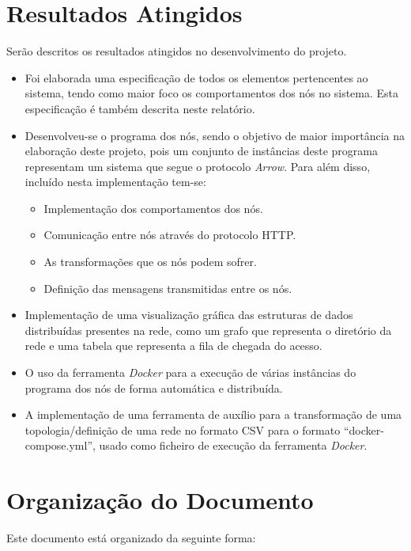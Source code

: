 \section{Resultados Atingidos}
\label{introducao:sec:resultados}
Serão descritos os resultados atingidos no desenvolvimento do projeto.

\begin{itemize}
    \item Foi elaborada uma especificação de todos os elementos pertencentes ao sistema, tendo como maior foco os comportamentos dos nós no sistema. Esta especificação é também descrita neste relatório. 
    \item Desenvolveu-se o programa dos nós, sendo o objetivo de maior importância na elaboração deste projeto, pois um conjunto de instâncias deste programa representam um sistema que segue o protocolo \emph{Arrow}. Para além disso, incluído nesta implementação tem-se:

    \begin{itemize}
	\item Implementação dos comportamentos dos nós.
	\item Comunicação entre nós através do protocolo \acs{HTTP}.
	\item As transformações que os nós podem sofrer.
	\item Definição das mensagens transmitidas entre os nós.
    \end{itemize}

    \item Implementação de uma visualização gráfica das estruturas de dados distribuídas presentes na rede, como um grafo que representa o diretório da rede e uma tabela que representa a fila de chegada do acesso.
    \item O uso da ferramenta \emph{Docker} para a execução de várias instâncias do programa dos nós de forma automática e distribuída.
    \item A implementação de uma ferramenta de auxílio para a transformação de uma topologia/definição de uma rede no formato \acs{CSV} para o formato ``docker-compose.yml'', usado como ficheiro de execução da ferramenta \emph{Docker}.

\end{itemize}




\section{Organização do Documento}
\label{introducao:sec:organizacao}
Este documento está organizado da seguinte forma:

